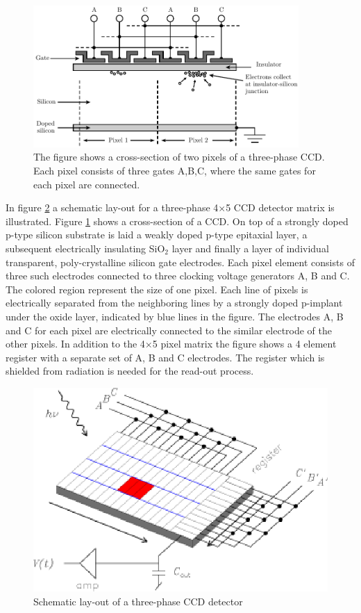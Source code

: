 \begin{figure}[htpb]
	\centering
	\includegraphics[width=0.9\textwidth]{ccd-gate-structure2.pdf}
	\caption{The figure shows a cross-section of two pixels of a three-phase CCD. Each pixel
	consists of three gates A,B,C, where the same gates for each pixel are connected.}
	\label{fig:ccd-gate-structure}
\end{figure}

%
In figure \ref{CCD.figschematic} a schematic lay-out for a three-phase
4$\times $5 CCD detector matrix is illustrated. Figure \ref{fig:ccd-gate-structure} shows
a cross-section of a CCD. On top of a strongly
doped p-type silicon substrate is laid a weakly doped p-type epitaxial
layer, a subsequent electrically insulating SiO$_2$ layer and finally
a layer of individual transparent, poly-crystalline silicon gate
electrodes.  Each pixel element consists of three such electrodes
connected to three clocking voltage generators A, B and C. The colored
region represent the size of one pixel. Each line of pixels is
electrically separated from the neighboring lines by a strongly doped
p-implant under the oxide layer, indicated by blue lines in the
figure. The electrodes A, B and C for each pixel are electrically
connected to the similar electrode of the other pixels. In addition to
the 4$\times$5 pixel matrix the figure shows a 4 element register with
a separate set of A, B and C electrodes. The register which is
shielded from radiation is needed for the read-out process.

\begin{figure}[h]
  \centering
	\includegraphics{CCD_schematic.eps}
  \caption{Schematic lay-out of a three-phase CCD detector}
  \label{CCD.figschematic}
\end{figure}

